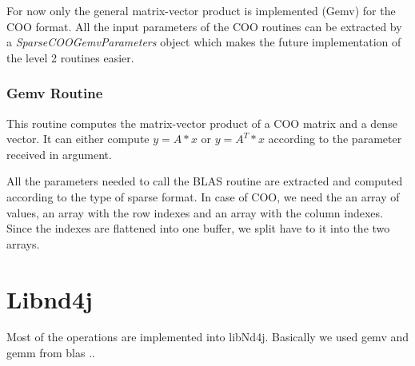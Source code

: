 For now only the general matrix-vector product is implemented (Gemv) for the COO format. All the input parameters of the COO routines can be extracted by a \textit{SparseCOOGemvParameters} object which makes the future implementation of the level 2 routines easier.

\subsubsection{Gemv Routine}
This routine computes the matrix-vector product of a COO matrix and a dense vector. It can either compute $y = A*x$ or $y = A^{T}*x$ according to the parameter received in argument.

All the parameters needed to call the BLAS routine are extracted and computed according to the type of sparse format.
In case of COO, we need the an array of values, an array with the row indexes and an array with the column indexes. Since the indexes are flattened into one buffer, we split have to it into the two arrays.

\section{Libnd4j}
Most of the operations are implemented into libNd4j. Basically we used gemv and gemm from blas
..
